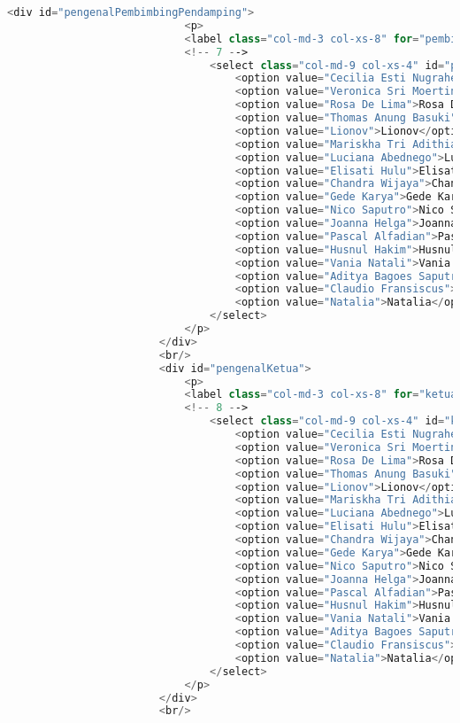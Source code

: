 \begin{lstlisting}[language=PHP,basicstyle=\tiny,caption=skripsi.php]
						<div id="pengenalPembimbingPendamping">
							<p>
							<label class="col-md-3 col-xs-8" for="pembimbing2">Pembimbing Pendamping:</label>
							<!-- 7 -->
								<select class="col-md-9 col-xs-4" id="pembimbing2" name="namaPembimbingPendamping" ng-model="namaPembimbingPendamping">
									<option value="Cecilia Esti Nugraheni">Cecilia Esti Nugraheni</option>
									<option value="Veronica Sri Moertini">Veronica Sri Moertini</option>
									<option value="Rosa De Lima">Rosa De Lima</option>
									<option value="Thomas Anung Basuki">Thomas Anung Basuki</option>
									<option value="Lionov">Lionov</option>
									<option value="Mariskha Tri Adithia">Mariskha Tri Adithia</option>
									<option value="Luciana Abednego">Luciana Abednego</option>
									<option value="Elisati Hulu">Elisati Hulu</option>
									<option value="Chandra Wijaya">Chandra Wijaya</option>
									<option value="Gede Karya">Gede Karya</option>
									<option value="Nico Saputro">Nico Saputro</option>
									<option value="Joanna Helga">Joanna Helga</option>
									<option value="Pascal Alfadian">Pascal Alfadian</option>
									<option value="Husnul Hakim">Husnul Hakim</option>
									<option value="Vania Natali">Vania Natali</option>
									<option value="Aditya Bagoes Saputra">Aditya Bagoes Saputra</option>
									<option value="Claudio Fransiscus">Claudio Fransiscus</option>
									<option value="Natalia">Natalia</option>
								</select>    
							</p>
						</div>
						<br/>
						<div id="pengenalKetua">
							<p>
							<label class="col-md-3 col-xs-8" for="ketua">Ketua Tim Penguji:</label>
							<!-- 8 -->
								<select class="col-md-9 col-xs-4" id="ketua" name="namaKetuaTimPenguji" ng-model="namaKetuaTimPenguji">
									<option value="Cecilia Esti Nugraheni">Cecilia Esti Nugraheni</option>
									<option value="Veronica Sri Moertini">Veronica Sri Moertini</option>
									<option value="Rosa De Lima">Rosa De Lima</option>
									<option value="Thomas Anung Basuki">Thomas Anung Basuki</option>
									<option value="Lionov">Lionov</option>
									<option value="Mariskha Tri Adithia">Mariskha Tri Adithia</option>
									<option value="Luciana Abednego">Luciana Abednego</option>
									<option value="Elisati Hulu">Elisati Hulu</option>
									<option value="Chandra Wijaya">Chandra Wijaya</option>
									<option value="Gede Karya">Gede Karya</option>
									<option value="Nico Saputro">Nico Saputro</option>
									<option value="Joanna Helga">Joanna Helga</option>
									<option value="Pascal Alfadian">Pascal Alfadian</option>
									<option value="Husnul Hakim">Husnul Hakim</option>
									<option value="Vania Natali">Vania Natali</option>
									<option value="Aditya Bagoes Saputra">Aditya Bagoes Saputra</option>
									<option value="Claudio Fransiscus">Claudio Fransiscus</option>
									<option value="Natalia">Natalia</option>
								</select>							
							</p>
						</div>
						<br/>
					

\end{lstlisting}
